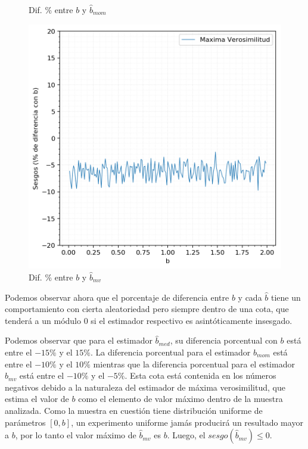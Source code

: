 \begin{figure}[H]
\begin{minipage}[t]{.325\textwidth}
		\caption{\footnotesize Dif. \% entre $b$ y $\hat{b}_{mom}$}
		\label{fig:ej6-sesgos-err-mom}
	\end{minipage}
	\begin{minipage}[t]{.325\textwidth}
		\centering
		\includegraphics[scale=0.37]{imagenes/sesgos-mv-porcentaje-err.png}
		\caption{\footnotesize Dif. \% entre $b$ y $\hat{b}_{mv}$}
		\label{fig:ej6-sesgos-err-mv}
	\end{minipage}
\end{figure}

Podemos observar ahora que el porcentaje de diferencia entre $b$ y cada $\hat{b}$ tiene un comportamiento con cierta aleatoriedad pero siempre dentro de una cota, que tenderá a un módulo $0$ si el estimador respectivo es asintóticamente insesgado.

\vskip 8pt

Podemos observar que para el estimador $\hat{b}_{med}$, su diferencia porcentual con $b$ está entre el $-15\%$ y el $15\%$. La diferencia porcentual para el estimador $\hat{b}_{mom}$ está entre el $-10\%$ y el $10\%$ mientras que la diferencia porcentual para el estimador $\hat{b}_{mv}$ está entre el $-10\%$ y el $-5\%$. Esta cota está contenida en los números negativos debido a la naturaleza del estimador de máxima verosimilitud, que estima el valor de $b$ como el elemento de valor máximo dentro de la muestra analizada. Como la muestra en cuestión tiene distribución uniforme de parámetros $[0, b]$, un experimento uniforme jamás producirá un resultado mayor a $b$, por lo tanto el valor máximo de $\hat{b}_{mv}$ es $b$. Luego, el $sesgo(\hat{b}_{mv}) \leq 0$.

